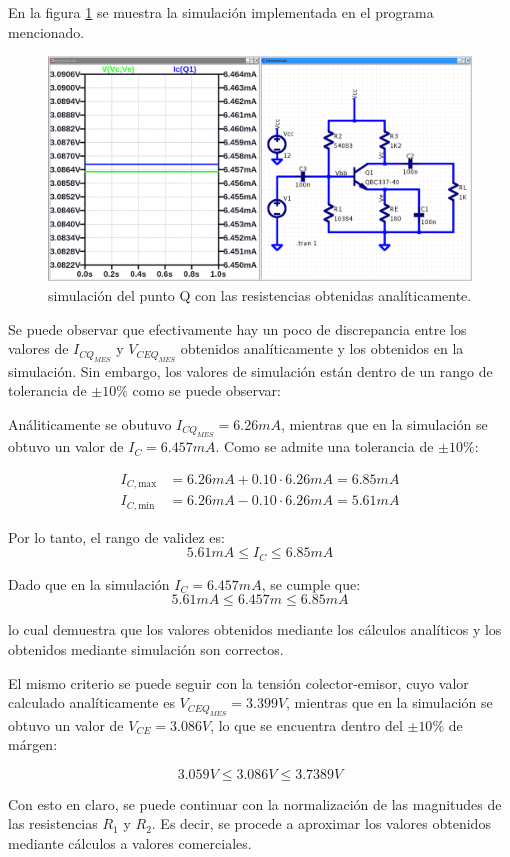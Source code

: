 En la figura \ref{fig:pto_q_ideal} se muestra la simulación implementada en el programa
mencionado.

\begin{figure}[!ht]
    \centering
    \includegraphics[width=0.9\linewidth]{images/pto_q_ideal.png}
    \caption{simulación del punto Q con las resistencias obtenidas analíticamente.}
    \label{fig:pto_q_ideal}
\end{figure}

Se puede observar que efectivamente hay un poco de discrepancia entre los valores de
$I_{CQ_{MES}}$ y $V_{CEQ_{MES}}$ obtenidos analíticamente y los obtenidos en la simulación.
Sin embargo, los valores de simulación están dentro de un rango de tolerancia de $\pm10\%$
como se puede observar:

Análiticamente se obutuvo $I_{CQ_{MES}} = 6.26mA$, mientras que en la simulación se obtuvo un valor de $I_C = 6.457mA$.
Como se admite una tolerancia de $\pm 10\%$:

\begin{align*}
I_{C,\text{max}} &= 6.26mA + 0.10 \cdot 6.26mA = 6.85mA \\
I_{C,\text{min}} &= 6.26mA - 0.10 \cdot 6.26mA = 5.61mA
\end{align*}

Por lo tanto, el rango de validez es:
\[
5.61mA \leq I_C \leq 6.85mA
\]

Dado que en la simulación $I_C = 6.457mA$, se cumple que:
\[
5.61mA \leq 6.457m \leq 6.85mA
\]

lo cual demuestra que los valores obtenidos mediante los cálculos analíticos y los 
obtenidos mediante simulación son correctos.

El mismo criterio se puede seguir con la tensión colector-emisor, cuyo valor calculado analíticamente es
$V_{CEQ_{MES}} = 3.399V$, mientras que en la simulación se obtuvo un valor de $V_{CE} = 3.086V$, lo que se
encuentra dentro del $\pm 10\%$ de márgen:

\[
3.059V \leq 3.086V \leq 3.7389V
\]

Con esto en claro, se puede continuar con la normalización de las magnitudes
de las resistencias $R_1$ y $R_2$. Es decir, se procede a aproximar los valores obtenidos 
mediante cálculos a valores comerciales.
